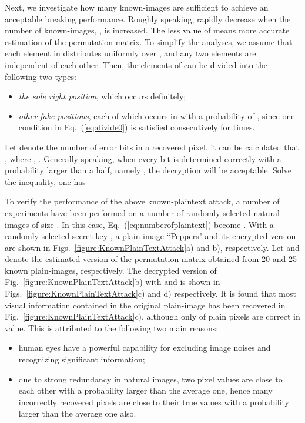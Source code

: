 \documentclass[3p,preprint,11pt]{elsarticle}
\begin{document}
Next, we investigate how many known-images are sufficient to achieve an
acceptable breaking performance. Roughly speaking,
 rapidly decrease when the number of
known-images, , is increased. The less value of
 means more accurate estimation of
the permutation matrix. To simplify the analyses, we assume that
each element in  distributes uniformly over , and
any two elements are independent of each other. Then, the elements
of  can be divided into the following two types:
\begin{itemize}
\item \textit{the sole right position}, which occurs definitely;

\item \textit{other fake positions}, each of which occurs in 
with a probability of , since one condition in
Eq.~(\ref{eq:divide0}) is satisfied consecutively for  times.
\end{itemize}

Let  denote the number of error bits in a recovered pixel, it
can be calculated that
, where
, . Generally speaking,
when every bit is determined correctly with a probability larger
than a half, namely , the decryption will be acceptable.
Solve the inequality, one has


To verify the performance of the above known-plaintext attack, a
number of experiments have been performed on a number of
randomly selected natural images of size . In this
case, Eq.~(\ref{eq:numberofplaintext}) become
. With a randomly selected secret
key , a plain-image
``Peppers" and its encrypted version are shown in
Figs.~\ref{figure:KnownPlainTextAttack}a) and b), respectively. Let
 and  denote the estimated version of the
permutation matrix  obtained from 20 and 25 known
plain-images, respectively. The decrypted version of
Fig.~\ref{figure:KnownPlainTextAttack}b) with  and
 is shown in Figs.~\ref{figure:KnownPlainTextAttack}c)
and d) respectively. It is found that most visual information
contained in the original plain-image has been recovered in
Fig.~\ref{figure:KnownPlainTextAttack}c), although only
 of plain pixels are correct in value.
This is attributed to the following two main reasons:

\begin{itemize}
\item human eyes have a powerful capability for excluding image noises
and recognizing significant information;

\item due to strong redundancy in natural images, two pixel values
are close to each other with a probability larger than the average
one, hence many incorrectly recovered pixels are close to their true
values with a probability larger than the average one also.
\end{itemize}
\end{document}
